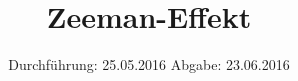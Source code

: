 


\subject{Versuchsprotokoll}
\title{Zeeman-Effekt}
\date{
  Durchführung: 25.05.2016
  \hspace{3em}
  Abgabe: 23.06.2016
}




\maketitle
\thispagestyle{empty}







\printbibliography


